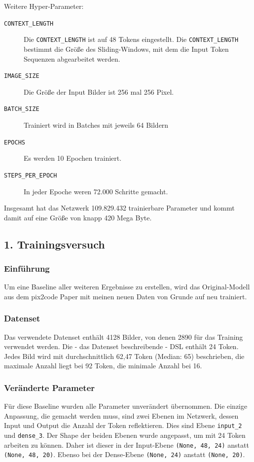 \documentclass[pdftex,a4paper,halfparskip, article]{scrartcl}
\begin{document}
Weitere Hyper-Parameter:
\begin{description}
	\item[\texttt{CONTEXT\_LENGTH}] Die \texttt{CONTEXT\_LENGTH} ist auf 48 Tokens eingestellt. Die \texttt{CONTEXT\_LENGTH} bestimmt die Größe des Sliding-Windows, mit dem die Input Token Sequenzen abgearbeitet werden. 
	\item[\texttt{IMAGE\_SIZE}] Die Größe der Input Bilder ist 256 mal 256 Pixel.
	\item[\texttt{BATCH\_SIZE}] Trainiert wird in Batches mit jeweils 64 Bildern
	\item[\texttt{EPOCHS}] Es werden 10 Epochen trainiert.
	\item[\texttt{STEPS\_PER\_EPOCH}] In jeder Epoche weren 72.000 Schritte gemacht.	
\end{description}

Insgesamt hat das Netzwerk 109.829.432 trainierbare Parameter und kommt damit auf eine Größe von knapp 420 Mega Byte.

\subsection{1. Trainingsversuch}

\subsubsection*{Einführung}

Um eine Baseline aller weiteren Ergebnisse zu erstellen, wird das Original-Modell aus dem pix2code Paper mit meinen neuen Daten von Grunde auf neu trainiert. 

\subsubsection*{Datenset}

Das verwendete Datenset enthält 4128 Bilder, von denen 2890 für das Training verwendet werden. Die - das Datenset beschreibende - DSL enthält 24 Token. Jedes Bild wird mit durchschnittlich 62,47 Token (Median: 65) beschrieben, die maximale Anzahl liegt bei 92 Token, die minimale Anzahl bei 16. 

\subsubsection*{Veränderte Parameter}

Für diese Baseline wurden alle Parameter unverändert übernommen. Die einzige Anpassung, die gemacht werden muss, sind zwei Ebenen im Netzwerk, dessen Input und Output die Anzahl der Token reflektieren. Dies sind Ebene \texttt{input\_2} und \texttt{dense\_3}. Der Shape der beiden Ebenen wurde angepasst, um mit 24 Token arbeiten zu können. Daher ist dieser in der Input-Ebene \texttt{(None, 48, 24)} anstatt \texttt{(None, 48, 20)}. Ebenso bei der Dense-Ebene \texttt{(None, 24)} anstatt \texttt{(None, 20)}.
\end{document}
